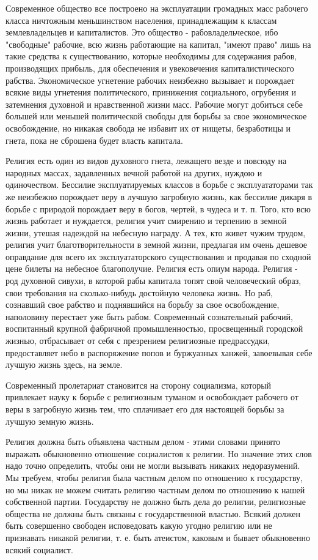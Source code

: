 \documentclass[12pt]{article}
\newcommand{\parnum}{(\arabic{parcount})}
\newcounter{parcount}
\newenvironment{parnumbers}{%
  \par%
  \everypar{\noindent \stepcounter{parcount}\marginpar[]{\parnum}}%
}{}
\begin{document}
\begin{parnumbers}
Современное общество все построено на эксплуатации громадных масс рабочего класса ничтожным меньшинством населения, принадлежащим к классам землевладельцев и капиталистов. Это общество - рабовладельческое, ибо "свободные" рабочие, всю жизнь работающие на капитал, "имеют право" лишь на такие средства к существованию, которые необходимы для содержания рабов, производящих прибыль, для обеспечения и увековечения капиталистического рабства. Экономическое угнетение рабочих неизбежно вызывает и порождает всякие виды угнетения политического, принижения социального, огрубения и затемнения духовной и нравственной жизни масс. Рабочие могут добиться себе большей или меньшей политической свободы для борьбы за свое экономическое освобождение, но никакая свобода не избавит их от нищеты, безработицы и гнета, пока не сброшена будет власть капитала.

Религия есть один из видов духовного гнета, лежащего везде и повсюду на народных массах, задавленных вечной работой на других, нуждою и одиночеством. Бессилие эксплуатируемых классов в борьбе с эксплуататорами так же неизбежно порождает веру в лучшую загробную жизнь, как бессилие дикаря в борьбе с природой порождает веру в богов, чертей, в чудеса и т. п. Того, кто всю жизнь работает и нуждается, религия учит смирению и терпению в земной жизни, утешая надеждой на небесную награду. А тех, кто живет чужим трудом, религия учит благотворительности в земной жизни, предлагая им очень дешевое оправдание для всего их эксплуататорского существования и продавая по сходной цене билеты на небесное благополучие. Религия есть опиум народа. Религия - род духовной сивухи, в которой рабы капитала топят свой человеческий образ, свои требования на сколько-нибудь достойную человека жизнь. Но раб, сознавший свое рабство и поднявшийся на борьбу за свое освобождение, наполовину перестает уже быть рабом. Современный сознательный рабочий, воспитанный крупной фабричной промышленностью, просвещенный городской жизнью, отбрасывает от себя с презрением религиозные предрассудки, предоставляет небо в распоряжение попов и буржуазных ханжей, завоевывая себе лучшую жизнь здесь, на земле.

Современный пролетариат становится на сторону социализма, который привлекает науку к борьбе с религиозным туманом и освобождает рабочего от веры в загробную жизнь тем, что сплачивает его для настоящей борьбы за лучшую земную жизнь.

Религия должна быть объявлена частным делом - этими словами принято выражать обыкновенно отношение социалистов к религии. Но значение этих слов надо точно определить, чтобы они не могли вызывать никаких недоразумений. Мы требуем, чтобы религия была частным делом по отношению к государству, но мы никак не можем считать религию частным делом по отношению к нашей собственной партии. Государству не должно быть дела до религии, религиозные общества не должны быть связаны с государственной властью. Всякий должен быть совершенно свободен исповедовать какую угодно религию или не признавать никакой религии, т. е. быть атеистом, каковым и бывает обыкновенно всякий социалист.


\end{parnumbers}
\end{document}
